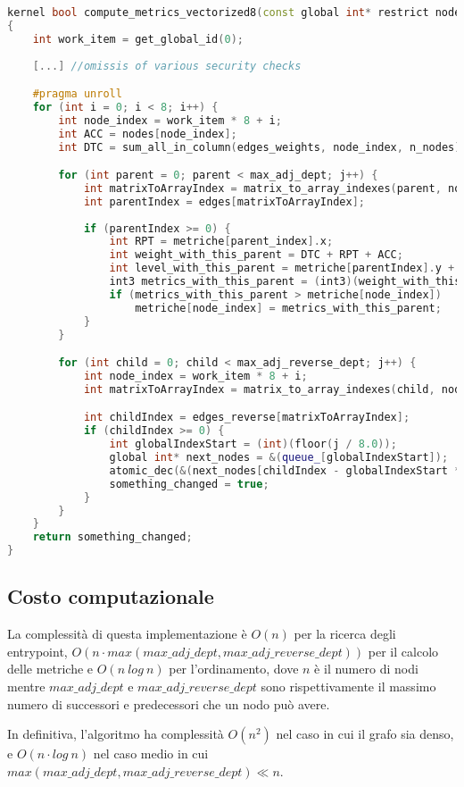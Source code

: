\begin{lstlisting}[language=C++, caption={Vectorized compute metrics kernel},captionpos=b]
kernel bool compute_metrics_vectorized8(const global int* restrict nodes, global int8* restrict queue_, const global edge_t* restrict edges, const global edge_t* restrict edges_reverse, const global edge_t* restrict edges_weights, global int3* metriche, const int max_adj_dept, const int max_adj_reverse_dept, const int n_nodes)
{
	int work_item = get_global_id(0);
	
	[...] //omissis of various security checks

	#pragma unroll
	for (int i = 0; i < 8; i++) {
		int node_index = work_item * 8 + i;
		int ACC = nodes[node_index];
		int DTC = sum_all_in_column(edges_weights, node_index, n_nodes);

		for (int parent = 0; parent < max_adj_dept; j++) {
			int matrixToArrayIndex = matrix_to_array_indexes(parent, node_index, n_nodes);
			int parentIndex = edges[matrixToArrayIndex];
			
			if (parentIndex >= 0) {
				int RPT = metriche[parent_index].x;
				int weight_with_this_parent = DTC + RPT + ACC;
				int level_with_this_parent = metriche[parentIndex].y + 1;
				int3 metrics_with_this_parent = (int3)(weight_with_this_parent, level_with_this_parent, node_index);
				if (metrics_with_this_parent > metriche[node_index])
					metriche[node_index] = metrics_with_this_parent;
			}
		}

		for (int child = 0; child < max_adj_reverse_dept; j++) {
			int node_index = work_item * 8 + i;
			int matrixToArrayIndex = matrix_to_array_indexes(child, node_index, n_nodes);

			int childIndex = edges_reverse[matrixToArrayIndex];
			if (childIndex >= 0) {
				int globalIndexStart = (int)(floor(j / 8.0));
				global int* next_nodes = &(queue_[globalIndexStart]);
				atomic_dec(&(next_nodes[childIndex - globalIndexStart * 8]));
				something_changed = true;
			}
		}
	}
	return something_changed;
}
\end{lstlisting}


\subsection{Costo computazionale}
La complessità di questa implementazione è $O(n)$ per la ricerca degli entrypoint, $O(n \cdot max(max\_adj\_dept, max\_adj\_reverse\_dept))$ per il calcolo delle metriche e $O(n\ log\ n)$ per l'ordinamento, dove $n$ è il numero di nodi mentre $max\_adj\_dept$ e $max\_adj\_reverse\_dept$ sono rispettivamente il massimo numero di successori e predecessori che un nodo può avere.

In definitiva, l'algoritmo ha complessità $O(n^{2})$ nel caso in cui il grafo sia denso, e $O(n \cdot log\ n)$ nel caso medio in cui $max(max\_adj\_dept, max\_adj\_reverse\_dept) \ll n$.